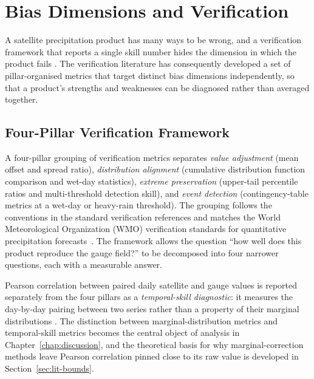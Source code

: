 \section{Bias Dimensions and Verification}\label{sec:lit-verification}

A satellite precipitation product has many ways to be wrong, and
a verification framework that reports a single skill number
hides the dimension in which the product fails
\citep{ref:murphy1993, ref:ebert2007}. The verification
literature has consequently developed a set of pillar-organised
metrics that target distinct bias dimensions independently, so
that a product's strengths and weaknesses can be diagnosed
rather than averaged together.

\subsection{Four-Pillar Verification Framework}

A four-pillar grouping of verification
metrics separates \textit{value adjustment} (mean offset and spread
ratio), \textit{distribution alignment} (cumulative distribution
function comparison and wet-day statistics), \textit{extreme
preservation} (upper-tail percentile ratios and multi-threshold
detection skill), and \textit{event detection} (contingency-table
metrics at a wet-day or heavy-rain threshold). The grouping
follows the conventions in the standard verification references
\citep{ref:ebert2007, ref:wilks2020} and matches the World
Meteorological Organization (WMO) verification standards for
quantitative precipitation forecasts~\citep{ref:wmo1485, ref:wmo1132}. 
The framework allows the question \enquote{how well does this product 
reproduce the gauge field?} to be decomposed into four narrower questions,
each with a measurable answer.

Pearson correlation between paired daily satellite and gauge
values is reported separately from the four pillars as a
\textit{temporal-skill diagnostic}: it measures the day-by-day
pairing between two series rather than a property of their
marginal distributions \citep{ref:gupta2009}. The distinction between
marginal-distribution metrics and temporal-skill metrics becomes
the central object of analysis in
Chapter~\ref{chap:discussion}, and the theoretical basis for
why marginal-correction methods leave Pearson correlation
pinned close to its raw value is developed in
Section~\ref{sec:lit-bounds}.

